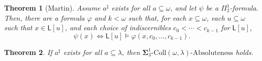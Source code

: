 \documentclass[10pt,a4paper]{amsart}
\newtheorem{theorem}{Theorem}
\renewcommand\le\leqslant
\begin{document}
\begin{theorem}[Martin]\label{martincountable}
Assume $a^\sharp$ exists for all $a\subseteq\omega$, and let $\psi$ be a $\Pi^1_2$-formula. Then, there are a formula $\varphi$ and $k<\omega$ such that, for each $x\subseteq\omega$, each $u\subseteq\omega$ such that $x\in \mathsf L[u]$, and each choice of indiscernibles $c_0<\cdots<c_{k-1}$ for $\mathsf L[u]$,
\[\psi(x) \Leftrightarrow \mathsf L[u]\models \varphi(x,c_0,\ldots,c_{k-1}).\]
\end{theorem}

\begin{theorem}\label{martincons}
If $a^\sharp$ exists for all $a\subseteq\lambda$, then $ \boldsymbol\Sigma^1_3\text{-}\mathrm{Coll}(\omega,\lambda)\text{-Absoluteness}$ holds.%
\end{theorem}
\end{document}
